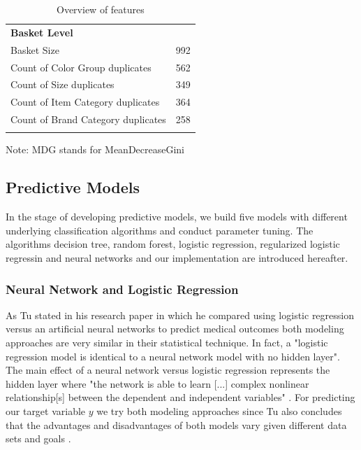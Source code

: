 \documentclass[12pt]{article}
\begin{document}
\begin{table}[H]
\begin{minipage}{.5\linewidth}
\begin{tabular}{|lr}
\noalign{\smallskip}
\textbf{Basket Level}\\ 

\noalign{\smallskip}
Basket Size & 992\\
Count of Color Group duplicates & 562\\
Count of Size duplicates & 349\\
Count of Item Category duplicates & 364\\
Count of Brand Category duplicates & 258\\
\noalign{\smallskip}
\hline\hline
        \end{tabular}
    \end{minipage} 
    \vspace{1ex}

     \raggedright    Note: MDG stands for MeanDecreaseGini    
    \caption{Overview of features}
	\label{tab:features}
\end{table}

\newpage
\subsection{Predictive Models}
In the stage of developing predictive models, we build five models with different underlying classification algorithms and conduct parameter tuning. The algorithms decision tree, random forest, logistic regression, regularized logistic regressin and neural networks and our implementation are introduced hereafter.

\subsubsection{Neural Network and Logistic Regression} \label{sssec:num1}
As Tu stated in his research paper \cite{tu1996advantages} in which he compared using logistic regression versus an artificial neural networks to predict medical outcomes both modeling approaches are very similar in their statistical technique. In fact, a "logistic regression model is identical to a neural network model with no hidden layer". The main effect of a neural network versus logistic regression represents the hidden layer where "the network is able to learn [...] complex nonlinear relationship[s] between the dependent and independent variables" \cite{tu1996advantages}. For predicting our target variable $y$ we try both modeling approaches since Tu also concludes that the advantages and disadvantages of both models vary given different data sets and goals \cite{tu1996advantages}.
\end{document}
